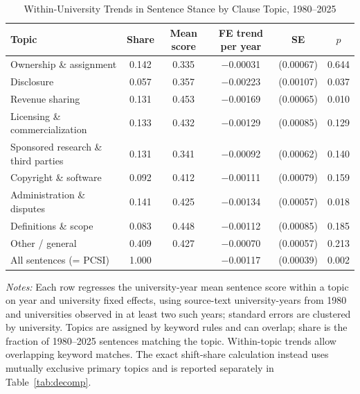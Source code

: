 \begin{table}[htbp]
\centering
\small
\caption{Within-University Trends in Sentence Stance by Clause Topic, 1980--2025}
\label{tab:topics}
\begin{threeparttable}
\begin{tabular}{lccccc}
\toprule
Topic & Share & Mean score & FE trend per year & SE & $p$ \\
\midrule
Ownership \& assignment & 0.142 & 0.335 & $-$0.00031 & (0.00067) & 0.644 \\
Disclosure & 0.057 & 0.357 & $-$0.00223 & (0.00107) & 0.037 \\
Revenue sharing & 0.131 & 0.453 & $-$0.00169 & (0.00065) & 0.010 \\
Licensing \& commercialization & 0.133 & 0.432 & $-$0.00129 & (0.00085) & 0.129 \\
Sponsored research \& third parties & 0.131 & 0.341 & $-$0.00092 & (0.00062) & 0.140 \\
Copyright \& software & 0.092 & 0.412 & $-$0.00111 & (0.00079) & 0.159 \\
Administration \& disputes & 0.141 & 0.425 & $-$0.00134 & (0.00057) & 0.018 \\
Definitions \& scope & 0.083 & 0.448 & $-$0.00112 & (0.00085) & 0.185 \\
Other / general & 0.409 & 0.427 & $-$0.00070 & (0.00057) & 0.213 \\
\midrule
All sentences (= PCSI) & 1.000 &  & $-$0.00117 & (0.00039) & 0.002 \\
\bottomrule
\end{tabular}
\begin{tablenotes}[flushleft]\footnotesize
\item \textit{Notes:} Each row regresses the university-year mean sentence score within a topic on year and university fixed effects, using source-text university-years from 1980 and universities observed in at least two such years; standard errors are clustered by university. Topics are assigned by keyword rules and can overlap; share is the fraction of 1980--2025 sentences matching the topic. Within-topic trends allow overlapping keyword matches. The exact shift-share calculation instead uses mutually exclusive primary topics and is reported separately in Table~\ref{tab:decomp}.
\end{tablenotes}
\end{threeparttable}
\end{table}
